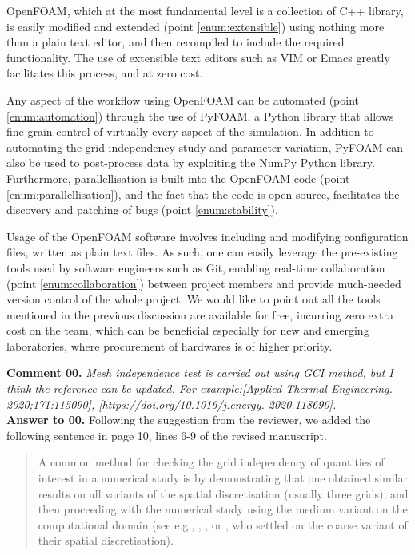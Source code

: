 \documentclass[10pt]{article}
\newcounter{question}
\newcommand{\name}{00}
\newcommand{\question}[1]{\refstepcounter{question} \noindent \textbf{Comment \name.\thequestion}\vskip 0.25cm \noindent \emph{#1}\\}
\newcommand{\answer}[1]{\noindent \textbf{Answer to \name.\thequestion}\vskip 0.25cm \noindent #1 \mbox{}\\}
\begin{document}
{    OpenFOAM, which at the most fundamental level is a collection of C++ library, is easily modified and extended (point \ref{enum:extensible}) using nothing more than a plain text editor, and then recompiled to include the required functionality. The use of extensible text editors such as VIM or Emacs greatly facilitates this process, and at zero cost.

    Any aspect of the workflow using OpenFOAM can be automated (point \ref{enum:automation}) through the use of PyFOAM, a Python library that allows fine-grain control of virtually every aspect of the simulation. In addition to automating the grid independency study and parameter variation, PyFOAM can also be used to post-process data by exploiting the NumPy Python library. Furthermore, parallellisation is built into the OpenFOAM code (point \ref{enum:parallellisation}), and the fact that the code is open source, facilitates the discovery and patching of bugs (point \ref{enum:stability}).

    Usage of the OpenFOAM software involves including and modifying configuration files, written as plain text files. As such, one can easily leverage the pre-existing tools used by software engineers such as Git, enabling real-time collaboration (point \ref{enum:collaboration}) between project members and provide much-needed version control of the whole project. We would like to point out all the tools mentioned in the previous discussion are available for free, incurring zero extra cost on the team, which can be beneficial especially for new and emerging laboratories, where procurement of hardwares is of higher priority.
}

\question{
    Mesh independence test is carried out using GCI method, but I think the reference can be updated. For example:[Applied Thermal Engineering. 2020;171:115090], [https://doi.org/10.1016/j.energy.
    2020.118690].
}

\answer{
  Following the suggestion from the reviewer, we added the following sentence in page 10, lines 6-9 of the revised manuscript.

  \begin{quotation}
    \color{blue}
    \noindent A common method for checking the grid independency of quantities of interest in a numerical study is by demonstrating that one obtained similar results on all variants of the spatial discretisation (usually three grids), and then proceeding with the numerical study using the medium variant on the computational domain (see e.g., \citet{Ding2013}, \citet{Ding2019}, or \citet{Wang2020}, who settled on the coarse variant of their spatial discretisation).
    \color{black}
  \end{quotation}
}
\end{document}
